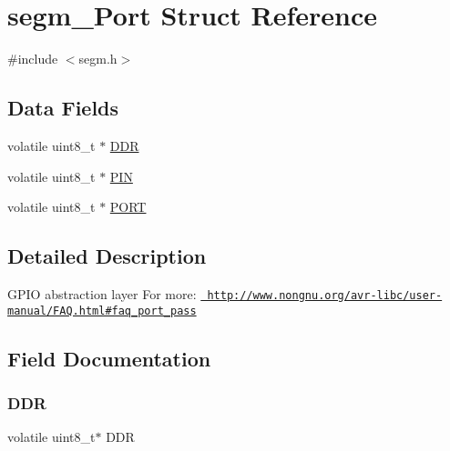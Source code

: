 \hypertarget{structsegm___port}{}\section{segm\+\_\+\+Port Struct Reference}
\label{structsegm___port}


{\ttfamily \#include $<$segm.\+h$>$}

\subsection*{Data Fields}
\begin{DoxyCompactItemize}
\item 
volatile uint8\+\_\+t $\ast$ \mbox{\hyperlink{structsegm___port_a0484e022a33d8689de01f1d5e5bc4154}{D\+DR}}
\item 
volatile uint8\+\_\+t $\ast$ \mbox{\hyperlink{structsegm___port_aa129fd1528d8c1dc9d5bbc70acd79bfd}{P\+IN}}
\item 
volatile uint8\+\_\+t $\ast$ \mbox{\hyperlink{structsegm___port_a0650eab751bc2dd1828ec6029ce5a688}{P\+O\+RT}}
\end{DoxyCompactItemize}


\subsection{Detailed Description}
G\+P\+IO abstraction layer For more\+: \href{http://www.nongnu.org/avr-libc/user-manual/FAQ.html#faq_port_pass}\texttt{ http\+://www.\+nongnu.\+org/avr-\/libc/user-\/manual/\+F\+A\+Q.\+html\#faq\+\_\+port\+\_\+pass} 

\subsection{Field Documentation}
\mbox{\label{structsegm___port_a0484e022a33d8689de01f1d5e5bc4154}} 
\subsubsection{\texorpdfstring{D\+DR}{DDR}}
{\footnotesize\ttfamily volatile uint8\+\_\+t$\ast$ D\+DR}

\mbox{\label{structsegm___port_aa129fd1528d8c1dc9d5bbc70acd79bfd}} 
